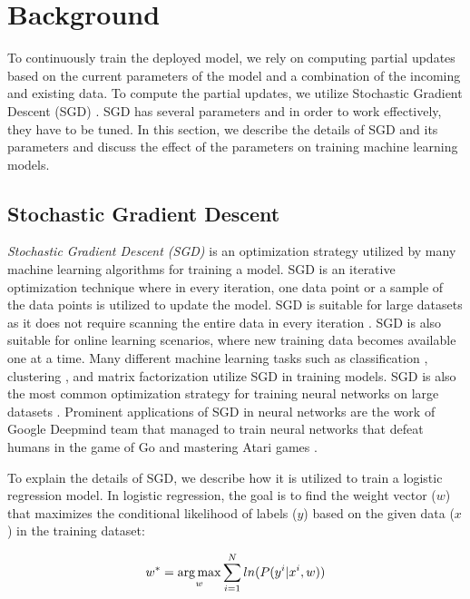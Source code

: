\section{Background} \label{background}
To continuously train the deployed model, we rely on computing partial updates based on the current parameters of the model and a combination of the incoming and existing data.
To compute the partial updates, we utilize Stochastic Gradient Descent (SGD) \cite{zhang2004solving}.
SGD has several parameters and in order to work effectively, they have to be tuned.
In this section, we describe the details of SGD and its parameters and discuss the effect of the parameters on training machine learning models.

\subsection{Stochastic Gradient Descent} \label{sgd}
\textit{Stochastic Gradient Descent (SGD)} is an optimization strategy utilized by many machine learning algorithms for training a model.
SGD is an iterative optimization technique where in every iteration, one data point or a sample of the data points is utilized to update the model.
SGD is suitable for large datasets as it does not require scanning the entire data in every iteration \cite{bottou2010large}.
SGD is also suitable for online learning scenarios, where new training data becomes available one at a time.
Many different machine learning tasks such as classification \cite{zhang2004solving, macmahan2013}, clustering \cite{bottou1995convergence}, and matrix factorization \cite{koren2009matrix,  funk2006netflix} utilize SGD in training models.
SGD is also the most common optimization strategy for training neural networks on large datasets \cite{dean2012large}.
Prominent applications of SGD in neural networks are the work of Google Deepmind team that managed to train neural networks that defeat humans in the game of Go \cite{silver2016mastering} and mastering Atari games \cite{mnih2013playing}.

To explain the details of SGD, we describe how it is utilized to train a logistic regression model.
In logistic regression, the goal is to find the weight vector ($w$) that maximizes the conditional likelihood of labels ($y$) based on the given data ($x$) in the training dataset:

\begin{equation}
w^* = \operatorname*{arg\,max}_w \sum_{i=1}^{N} ln(P(y^i | x^i, w))
\end{equation}

